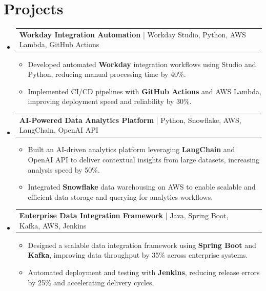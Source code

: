 \documentclass[letterpaper,11pt]{article}
\makeatletter
\newcommand{\resumeItem}[1]{
  \item\footnotesize{
    {#1 \vspace{-2pt}}
  }
}
\newcommand{\resumeProjectHeading}[2]{
    \item
    \begin{tabular*}{1.001\textwidth}{l@{\extracolsep{\fill}}r}
      \small#1 & \textbf{\small #2}\\
    \end{tabular*}\vspace{-7pt}
}
\newcommand{\resumeSubHeadingListStart}{\begin{itemize}[leftmargin=0pt, label={}]}
\newcommand{\resumeSubHeadingListEnd}{\end{itemize}}
\newcommand{\resumeItemListStart}{\begin{itemize}[leftmargin=*]}
\newcommand{\resumeItemListEnd}{\end{itemize}\vspace{-5pt}}
\makeatother
\begin{document}
\section{Projects}
    \vspace{-5pt}
    \resumeSubHeadingListStart

      \resumeProjectHeading
          {\textbf{Workday Integration Automation} | Workday Studio, Python, AWS Lambda, GitHub Actions}{}
        \resumeItemListStart
            \resumeItem{Developed automated \textbf{Workday} integration workflows using Studio and Python, reducing manual processing time by 40\%.}
            \resumeItem{Implemented CI/CD pipelines with \textbf{GitHub Actions} and AWS Lambda, improving deployment speed and reliability by 30\%.}
        \resumeItemListEnd
        \vspace{-12pt}

      \resumeProjectHeading
          {\textbf{AI-Powered Data Analytics Platform} | Python, Snowflake, AWS, LangChain, OpenAI API}{}
        \resumeItemListStart
            \resumeItem{Built an AI-driven analytics platform leveraging \textbf{LangChain} and OpenAI API to deliver contextual insights from large datasets, increasing analysis speed by 50\%.}
            \resumeItem{Integrated \textbf{Snowflake} data warehousing on AWS to enable scalable and efficient data storage and querying for analytics workflows.}
        \resumeItemListEnd
        \vspace{-12pt}

      \resumeProjectHeading
          {\textbf{Enterprise Data Integration Framework} | Java, Spring Boot, Kafka, AWS, Jenkins}{}
        \resumeItemListStart
            \resumeItem{Designed a scalable data integration framework using \textbf{Spring Boot} and \textbf{Kafka}, improving data throughput by 35\% across enterprise systems.}
            \resumeItem{Automated deployment and testing with \textbf{Jenkins}, reducing release errors by 25\% and accelerating delivery cycles.}
        \resumeItemListEnd

    \resumeSubHeadingListEnd
\end{document}
